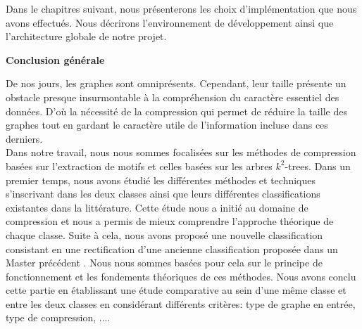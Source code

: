 \documentclass[a4paper,oneside,12pt]{report}
\theoremstyle{definition}
\begin{document}
	Dans le chapitres suivant, nous présenterons les choix d'implémentation que nous avons effectués. Nous décrirons l'environnement de développement ainsi que l'architecture globale de notre projet. 
	
	
	

	


	
	




\newpage
\Huge{ 
			\textbf {Conclusion générale}} \\[0.5in]
			\normalsize
De nos jours, les graphes sont omniprésents. Cependant, leur taille présente un obstacle presque insurmontable à la compréhension du caractère essentiel des données. D'où la nécessité de la compression qui permet de réduire la taille des graphes tout en gardant le caractère utile de l'information incluse dans ces derniers.\\

Dans notre travail, nous nous sommes focalisées  sur les méthodes de compression basées sur l'extraction de motifs et celles basées sur les arbres $k^2$-trees. Dans un premier temps, nous avons étudié les différentes méthodes et techniques s'inscrivant dans les deux classes ainsi que leurs différentes classifications existantes dans la littérature. Cette étude nous a initié au domaine de compression et nous a permis de mieux comprendre l'approche théorique de chaque classe. Suite à cela, nous avons proposé une nouvelle classification consistant en une rectification d'une ancienne classification proposée dans un Master précédent \citep{master2017}. Nous nous sommes basées pour cela sur le principe de fonctionnement et les fondements théoriques de ces méthodes. Nous avons conclu cette partie en établissant une étude comparative au sein d'une même classe et entre les deux classes en considérant différents critères: type de graphe en entrée, type de compression, .... \\
\end{document}
